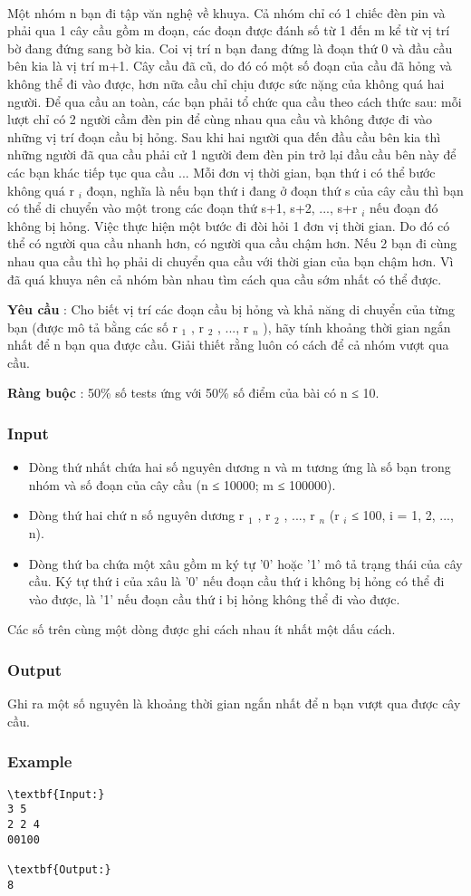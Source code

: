 

 

Một nhóm n bạn đi tập văn nghệ về khuya. Cả nhóm chỉ có 1 chiếc đèn pin và phải qua 1 cây cầu gồm m đoạn, các đoạn được đánh số từ 1 đến m kể từ vị trí bờ đang đứng sang bờ kia. Coi vị trí n bạn đang đứng là đoạn thứ 0 và đầu cầu bên kia là vị trí m+1. Cây cầu đã cũ, do đó có một số đoạn của cầu đã hỏng và không thể đi vào được, hơn nữa cầu chỉ chịu được sức nặng của không quá hai người. Để qua cầu an toàn, các bạn phải tổ chức qua cầu theo cách thức sau: mỗi lượt chỉ có 2 người cầm đèn pin để cùng nhau qua cầu và không được đi vào những vị trí đoạn cầu bị hỏng. Sau khi hai người qua đến đầu cầu bên kia thì những người đã qua cầu phải cử 1 người đem đèn pin trở lại đầu cầu bên này để các bạn khác tiếp tục qua cầu ... Mỗi đơn vị thời gian, bạn thứ i có thể bước không quá r $_ i $ đoạn, nghĩa là nếu bạn thứ i đang ở đoạn thứ s của cây cầu thì bạn có thể di chuyển vào một trong các đoạn thứ s+1, s+2, ..., s+r $_ i $ nếu đoạn đó không bị hỏng. Việc thực hiện một bước đi đòi hỏi 1 đơn vị thời gian. Do đó có thể có người qua cầu nhanh hơn, có người qua cầu chậm hơn. Nếu 2 bạn đi cùng nhau qua cầu thì họ phải di chuyển qua cầu với thời gian của bạn chậm hơn. Vì đã quá khuya nên cả nhóm bàn nhau tìm cách qua cầu sớm nhất có thể được.

\textbf{Yêu cầu } : Cho biết vị trí các đoạn cầu bị hỏng và khả năng di chuyển của từng bạn (được mô tả bằng các số r $_ 1 $ , r $_ 2 $ , ..., r $_ n $ ), hãy tính khoảng thời gian ngắn nhất để n bạn qua được cầu. Giải thiết rằng luôn có cách để cả nhóm vượt qua cầu.

\textbf{Ràng buộc } : 50\% số tests ứng với 50\% số điểm của bài có n ≤ 10.

\subsubsection{Input}
\begin{itemize}
	\item Dòng thứ nhất chứa hai số nguyên dương n và m tương ứng là số bạn trong nhóm và số đoạn của cây cầu (n ≤ 10000; m ≤ 100000).
	\item Dòng thứ hai chứ n số nguyên dương r $_ 1 $ , r $_ 2 $ , ..., r $_ n $ (r $_ i $ ≤ 100, i = 1, 2, ..., n).
	\item Dòng thứ ba chứa một xâu gồm m ký tự '0' hoặc '1' mô tả trạng thái của cây cầu. Ký tự thứ i của xâu là '0' nếu đoạn cầu thứ i không bị hỏng có thể đi vào được, là '1' nếu đoạn cầu thứ i bị hỏng không thể đi vào được.
\end{itemize}

Các số trên cùng một dòng được ghi cách nhau ít nhất một dấu cách.

\subsubsection{Output}

Ghi ra một số nguyên là khoảng thời gian ngắn nhất để n bạn vượt qua được cây cầu.

\subsubsection{Example}
\begin{verbatim}
\textbf{Input:}
3 5
2 2 4
00100

\textbf{Output:}
8
\end{verbatim}